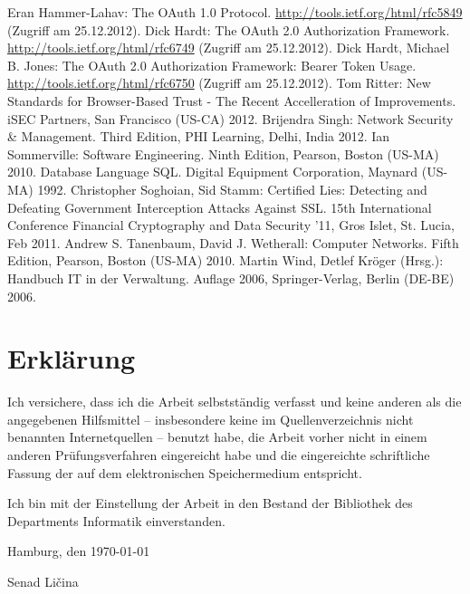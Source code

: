 \documentclass[12pt,a4paper,pointednumbers,abstracton]{scrartcl}
\begin{document}
\begin{raggedright}
\begin{thebibliography}{XXXXXXXX}
	 Eran Hammer-Lahav: The OAuth 1.0 Protocol. \url{http://tools.ietf.org/html/rfc5849} (Zugriff am 25.12.2012).
	 Dick Hardt: The OAuth 2.0 Authorization Framework. \url{http://tools.ietf.org/html/rfc6749} (Zugriff am 25.12.2012).
	 Dick Hardt, Michael B. Jones: The OAuth 2.0 Authorization Framework: Bearer Token Usage. \url{http://tools.ietf.org/html/rfc6750} (Zugriff am 25.12.2012).
	 Tom Ritter: New Standards for Browser-Based Trust - The Recent Accelleration of Improvements. iSEC Partners, San Francisco (US-CA) 2012.
	 Brijendra Singh: Network Security \& Management. Third Edition, PHI Learning, Delhi, India 2012.
	 Ian Sommerville: Software Engineering. Ninth Edition, Pearson, Boston (US-MA) 2010.
	 Database Language SQL. Digital Equipment Corporation, Maynard (US-MA) 1992.
	 Christopher Soghoian, Sid Stamm: Certified Lies: Detecting and Defeating Government Interception Attacks Against SSL. 15th International Conference Financial Cryptography and Data Security '11, Gros Islet, St. Lucia, Feb 2011.
	 Andrew S. Tanenbaum, David J. Wetherall: Computer Networks. Fifth Edition, Pearson, Boston (US-MA) 2010.
	 Martin Wind, Detlef Kröger (Hrsg.): Handbuch IT in der Verwaltung. Auflage 2006, Springer-Verlag, Berlin (DE-BE) 2006.
\end{thebibliography}
\end{raggedright}


\newpage
{}
\section*{Erklärung}
Ich versichere, dass ich die Arbeit selbstständig verfasst und keine anderen als die angegebenen Hilfsmittel -- insbesondere keine im Quellenverzeichnis nicht benannten Internetquellen -- benutzt habe, die Arbeit vorher nicht in einem anderen Prüfungsverfahren eingereicht habe und die eingereichte schriftliche Fassung der auf dem elektronischen Speichermedium entspricht.

Ich bin mit der Einstellung der Arbeit in den Bestand der Bibliothek des Departments Informatik einverstanden.

Hamburg, den \today

\bigskip
Senad Ličina
\end{document}
